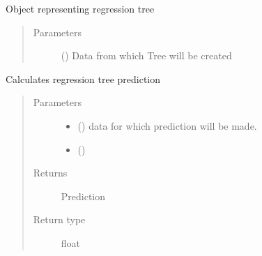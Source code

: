 \documentclass[letterpaper,10pt,english]{sphinxmanual}
\begin{document}
\begin{fulllineitems}
\label{\detokenize{tree:random_forest.tree.Tree}}
Object representing regression tree
\begin{quote}\begin{description}
\item[{Parameters}] \leavevmode
{} () \textendash{} Data from which Tree will be created

\end{description}\end{quote}

\begin{fulllineitems}
\label{\detokenize{tree:random_forest.tree.Tree.predict}}
Calculates regression tree prediction
\begin{quote}\begin{description}
\item[{Parameters}] \leavevmode\begin{itemize}
\item {} 
 () \textendash{} data for which prediction will be made.

\item {} 
 () \textendash{} 

\end{itemize}

\item[{Returns}] \leavevmode
Prediction

\item[{Return type}] \leavevmode
float

\end{description}\end{quote}

\end{fulllineitems}


\end{fulllineitems}
\end{document}

